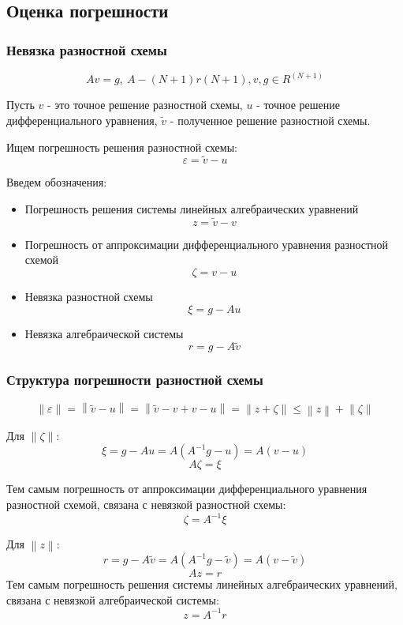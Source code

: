 \subsection{Оценка погрешности}

\subsubsection{Невязка разностной схемы}

\[
  Av = g,\ A - (N + 1) r (N + 1), v, g \in R^{(N + 1)}
\]

Пусть $ v $ - это точное решение разностной схемы, $ u $ -  точное решение дифференциального уравнения, 
$ \tilde{v} $ - полученное решение разностной схемы.

Ищем погрешность решения разностной схемы:
\[
  \varepsilon = \tilde{v} - u
\]

Введем обозначения:
\begin{itemize}
  \item Погрешность решения системы линейных алгебраических уравнений
  \[ z = \tilde{v} - v \]
  \item Погрешность от аппроксимации дифференциального уравнения разностной схемой
  \[ \zeta = v - u \]
  \item Невязка разностной схемы
  \[ \xi = g - Au \]
  \item Невязка алгебраической системы
  \[ r = g - A\tilde{v} \]
\end{itemize}

\subsubsection{Структура погрешности разностной схемы}
\[
  \left\lVert \varepsilon \right\rVert = \left\lVert \tilde{v} - u \right\rVert =
  \left\lVert \tilde{v} - v + v - u \right\rVert = \left\lVert z + \zeta  \right\rVert \leq \left\lVert z \right\rVert
  + \left\lVert \zeta \right\rVert 
\]

Для $\left\lVert \zeta\right\rVert$:
\[
  \xi = g - Au = A(A^{-1}g - u) = A(v - u)
\]
\[
  A\zeta  = \xi
\]

Тем самым погрешность от аппроксимации дифференциального уравнения разностной схемой, связана с невязкой разностной схемы:
\[
  \zeta = A^{-1} \xi 
\]

Для $\left\lVert z \right\rVert$:
\[
  r = g - A\tilde{v} = A(A^{-1}g - \tilde{v}) = A(v - \tilde{v})
\]
\[
  Az = r
\]
Тем самым погрешность решения системы линейных алгебраических уравнений, связана с невязкой алгебраической системы:
\[
  z = A^{-1}r
\]

